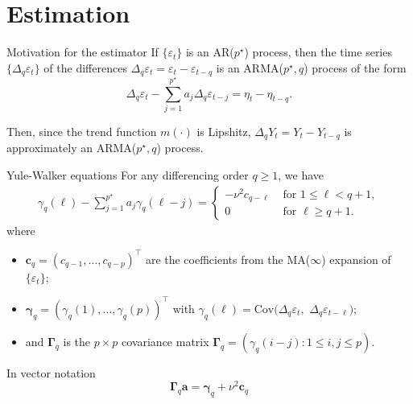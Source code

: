 \documentclass[10pt, handout]{beamer}
\newcommand{\Cov}{\mathrm{Cov}}
\begin{document}
\section{Estimation}

\begin{frame}{Motivation for the estimator}
If $\{\varepsilon_t\}$ is an AR($p^\star$) process, then the time series $\{ \Delta_q \varepsilon_t \}$ of the differences $\Delta_q \varepsilon_t = \varepsilon_t - \varepsilon_{t-q}$ is an ARMA($p^\star,q$) process of the form 
\begin{equation*}
\Delta_q \varepsilon_t - \sum_{j=1}^{p^\star} a_j \Delta_q \varepsilon_{t-j} = \eta_t - \eta_{t-q}. 
\end{equation*}\pause

Then, since the trend function $m(\cdot)$ is Lipshitz, $\Delta_q Y_{t} = Y_{t} - Y_{t-q}$ is approximately an ARMA($p^\star,q$) process.
\end{frame} 


\begin{frame}{Yule-Walker equations}
For any differencing order $q \geq 1$, we have
\vspace{-3mm}
\begin{align*}
	\gamma_q(\ell) - \sum_{j=1}^{p^\star} a_j \gamma_q(\ell - j) = \begin{cases}
	-\nu^2 c_{q - \ell} &\text{ for } 1\leq \ell < q+1,\\
	0 &\text{ for } \ell \geq q+1.
	\end{cases}
\end{align*}
where
\vspace{-3mm}
\begin{itemize}
	\item $\boldsymbol{c}_q = (c_{q-1},\dots,c_{q-p})^\top$ are the coefficients from the MA($\infty$) expansion of $\{ \varepsilon_t \}$;
	\item $\boldsymbol{\gamma}_q = (\gamma_q(1),\dots,\gamma_q(p))^\top$ with $\gamma_q(\ell) = \Cov(\Delta_q \varepsilon_t,$ $\Delta_q \varepsilon_{t-\ell})$;
	\item and $\boldsymbol{\Gamma}_q$ is the $p \times p$ covariance matrix $\boldsymbol{\Gamma}_q = (\gamma_q(i-j): 1 \le i,j \le p)$.
\end{itemize}\pause
\begin{block}{In vector notation}
\begin{equation*}\label{YU-eq}
\boldsymbol{\Gamma}_q \boldsymbol{a} = \boldsymbol{\gamma}_q + \nu^2 \boldsymbol{c}_q  
\end{equation*}
\end{block}
\end{frame}
\end{document}
